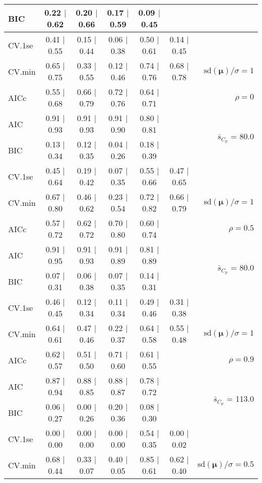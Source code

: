\documentclass[12pt]{article}
\newcommand{\mr}[1]{\mathrm{#1}}
\newcommand{\bm}[1]{\mathbf{#1}}
\begin{document}
\begin{table}[p]
\begin{center}
\begin{tabular}{l*{5}{c}|r}
BIC & 0.22 $\mid$ 0.62 & 0.20 $\mid$ 0.66 & 0.17 $\mid$ 0.59 & 0.09 $\mid$ 0.45 & & \\
 \hline 
CV.1se & 0.41 $\mid$ 0.55 & 0.15 $\mid$ 0.44 & 0.06 $\mid$ 0.38 & 0.50 $\mid$ 0.61 & 0.14 $\mid$ 0.45 &\\
CV.min & 0.65 $\mid$ 0.75 & 0.33 $\mid$ 0.55 & 0.12 $\mid$ 0.46 & 0.74 $\mid$ 0.76 & 0.68 $\mid$ 0.78 &  $\mr{sd}(\bm{\mu})/\sigma=1$ \\
AICc & 0.55 $\mid$ 0.68 & 0.66 $\mid$ 0.79 & 0.72 $\mid$ 0.76 & 0.64 $\mid$ 0.71 & & $\rho=0$ \\
AIC & 0.91 $\mid$ 0.93 & 0.91 $\mid$ 0.93 & 0.91 $\mid$ 0.90 & 0.80 $\mid$ 0.81 & & \multirow{2}{*}{$\bar{s}_{C_p}$ = 80.0} \\
BIC & 0.13 $\mid$ 0.34 & 0.12 $\mid$ 0.35 & 0.04 $\mid$ 0.26 & 0.18 $\mid$ 0.39 & & \\
 \hline 
CV.1se & 0.45 $\mid$ 0.64 & 0.19 $\mid$ 0.42 & 0.07 $\mid$ 0.35 & 0.55 $\mid$ 0.66 & 0.47 $\mid$ 0.65 &\\
CV.min & 0.67 $\mid$ 0.80 & 0.46 $\mid$ 0.62 & 0.23 $\mid$ 0.54 & 0.72 $\mid$ 0.82 & 0.66 $\mid$ 0.79 &  $\mr{sd}(\bm{\mu})/\sigma=1$ \\
AICc & 0.57 $\mid$ 0.72 & 0.62 $\mid$ 0.72 & 0.70 $\mid$ 0.80 & 0.60 $\mid$ 0.74 & & $\rho=0.5$ \\
AIC & 0.91 $\mid$ 0.95 & 0.91 $\mid$ 0.93 & 0.91 $\mid$ 0.89 & 0.81 $\mid$ 0.89 & & \multirow{2}{*}{$\bar{s}_{C_p}$ = 80.0} \\
BIC & 0.07 $\mid$ 0.31 & 0.06 $\mid$ 0.38 & 0.07 $\mid$ 0.35 & 0.14 $\mid$ 0.31 & & \\
 \hline 
CV.1se & 0.46 $\mid$ 0.45 & 0.12 $\mid$ 0.34 & 0.11 $\mid$ 0.34 & 0.49 $\mid$ 0.46 & 0.31 $\mid$ 0.38 &\\
CV.min & 0.64 $\mid$ 0.61 & 0.47 $\mid$ 0.46 & 0.22 $\mid$ 0.37 & 0.64 $\mid$ 0.58 & 0.55 $\mid$ 0.48 &  $\mr{sd}(\bm{\mu})/\sigma=1$ \\
AICc & 0.62 $\mid$ 0.57 & 0.51 $\mid$ 0.50 & 0.71 $\mid$ 0.60 & 0.61 $\mid$ 0.55 & & $\rho=0.9$ \\
AIC & 0.87 $\mid$ 0.94 & 0.88 $\mid$ 0.85 & 0.88 $\mid$ 0.87 & 0.78 $\mid$ 0.72 & & \multirow{2}{*}{$\bar{s}_{C_p}$ = 113.0} \\
BIC & 0.06 $\mid$ 0.27 & 0.00 $\mid$ 0.26 & 0.20 $\mid$ 0.36 & 0.08 $\mid$ 0.30 & & \\
 \hline 
CV.1se & 0.00 $\mid$ 0.00 & 0.00 $\mid$ 0.00 & 0.00 $\mid$ 0.00 & 0.54 $\mid$ 0.35 & 0.00 $\mid$ 0.02 &\\
CV.min & 0.68 $\mid$ 0.44 & 0.33 $\mid$ 0.07 & 0.40 $\mid$ 0.05 & 0.85 $\mid$ 0.61 & 0.62 $\mid$ 0.40 &  $\mr{sd}(\bm{\mu})/\sigma=0.5$ \\

\end{tabular}
\end{center}
\end{table}
\end{document}
